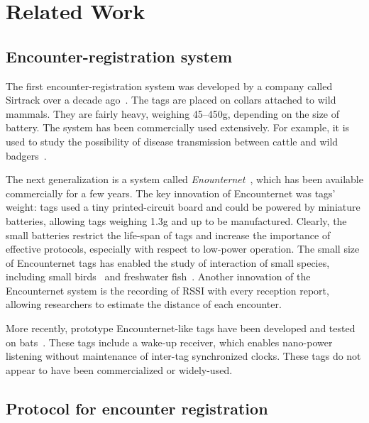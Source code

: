 \section{Related Work}
\label{sec:related-work}

\subsection{Encounter-registration system}
The first encounter-registration system was developed by a company called Sirtrack 
over a decade ago~\cite{Prangle2006NewRadiocolars}. The tags
are placed on collars attached to wild mammals. 
They are fairly heavy, weighing 45--450g, depending on the
size of battery. %
The system has been commercially used extensively. For example, it is used to study 
the possibility of disease transmission between cattle 
and wild badgers~\cite{Bohm2009WildlifeLivestock}.

The next generalization is a system called {\em Enounternet}~\cite{Menhill2012NovelTelemetry,Rutz2012AutomatedMapping}, 
which has been available commercially for a few years. 
The key innovation of Encounternet was tags' weight: 
tags used a tiny printed-circuit board and
could be powered by miniature batteries, allowing tags weighing 1.3g and up to be manufactured. 
Clearly, the small batteries restrict the life-span of tags and increase the importance of effective protocols, 
especially with respect to low-power operation. 
The small size of Encounternet tags has enabled the study of interaction of small species, 
including small birds~\cite{Levin2015Performance} and freshwater fish~\cite{Tentelier2016FishNetwork}.
Another innovation of the Encounternet system is the recording of RSSI with every reception report, allowing
researchers to estimate the distance of each encounter. 

More recently, prototype Encounternet-like tags have been developed and tested on
bats~\cite{Ripperger2016ProximitySensing,dressler2016bats}. These tags include a wake-up receiver, which
enables nano-power listening without maintenance of inter-tag synchronized clocks. These tags  
do not appear to have been commercialized or widely-used.




\subsection{Protocol for encounter registration}


